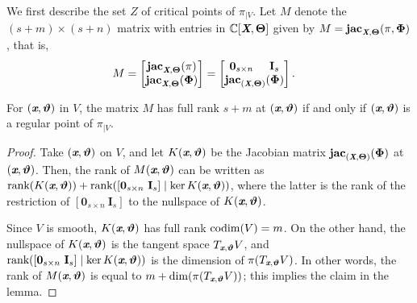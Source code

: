 \documentclass[sigconf]{acmart}
\def\Xb{\textit{\textbf{X}}}
\def\Thetab{\bm{\Theta}}
\def\thetab{\bm{\vartheta}}
\def\xb{\textit{\textbf{x}}}
\def\C{\mathbb{C}}
\def\jac{ \textbf{jac}}
\def\dt{s}
\def\bbm{\begin{bmatrix}}
\def\ebm{\end{bmatrix}}
\begin{document}
We first describe the set $Z$ of critical points of $\pi_{|V}$.  Let
$M$ denote the $(s+m) \times (s+n)$ matrix with entries in
$\C[\Xb,\Thetab]$ given by $M = \jac_{\Xb,\Thetab}(\pi,\bm\Phi)$, that
is,
\begin{align*}
M &= 
\bbm 
\jac_{\Xb,\Thetab}(\pi)\\
\jac_{\Xb,\Thetab}(\bm\Phi) 
\ebm 
=
\bbm 
\textbf{0}_{\dt \times n}\hspace{5mm}\textbf{I}_{\dt} \\
\jac_{(\Xb,\Thetab)}(\bm\Phi)
\ebm.
\end{align*}

\begin{lemma} 
  For $(\xb,\thetab)$ in $V$, the matrix $M$ has full rank $\dt+m$ at
  $(\xb,\thetab)$ if and only if $(\xb,\thetab)$ is a regular point of
  $\pi_{|V}.$
\end{lemma}
\begin{proof}
  Take $(\xb,\thetab)$ on $V$, and let $K(\xb,\thetab)$ be the
  Jacobian matrix $\jac_{(\Xb,\Thetab)}(\bm\Phi)$ at $(\xb,\thetab)$.
  Then, the rank of $M(\xb,\thetab)$ can be written as
  $\textup{rank}(K(\xb,\thetab)) + \textup{rank}([\textbf{0}_{\dt
      \times n}~\textbf{I}_{\dt}] \mid \ker K(\xb,\thetab))$, where
  the latter is the rank of the restriction of $[\textbf{0}_{\dt
      \times n}~\textbf{I}_{\dt}]$ to the nullspace of
  $K(\xb,\thetab)$.

  Since $V$ is smooth, $K(\xb,\thetab)$ has full rank ${\rm codim} (V)
  = m$. On the other hand, the nullspace of $K(\xb,\thetab)$ is the
  tangent space $T_{\xb,\thetab} V$, and
  $\textup{rank}([\textbf{0}_{\dt \times n}~\textbf{I}_{\dt}] \mid
  \ker K(\xb,\thetab))$ is the dimension of $\pi(T_{\xb,\thetab} V)$.
  In other words, the rank of $M(\xb,\thetab)$ is equal to
  $m+\dim(\pi(T_{\xb,\thetab} V))$; this implies the claim in the lemma.
\end{proof}
\end{document}
